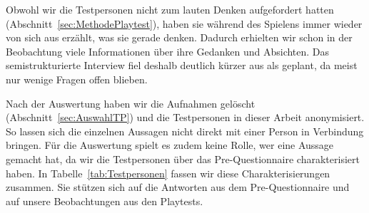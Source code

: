 \documentclass[../Main.tex]{subfiles}
\begin{document}
Obwohl wir die Testpersonen nicht zum lauten Denken aufgefordert hatten (Abschnitt~\ref{sec:MethodePlaytest}), haben sie während des Spielens immer wieder von sich aus erzählt, was sie gerade denken. Dadurch erhielten wir schon in der Beobachtung viele Informationen über ihre Gedanken und Absichten. Das semistrukturierte Interview fiel deshalb deutlich kürzer aus als geplant, da meist nur wenige Fragen offen blieben.

Nach der Auswertung haben wir die Aufnahmen gelöscht (Abschnitt~\ref{sec:AuswahlTP}) und die Testpersonen in dieser Arbeit anonymisiert. So lassen sich die einzelnen Aussagen nicht direkt mit einer Person in Verbindung bringen. Für die Auswertung spielt es zudem keine Rolle, wer eine Aussage gemacht hat, da wir die Testpersonen über das Pre-Questionnaire charakterisiert haben. In Tabelle~\ref{tab:Testpersonen} fassen wir diese Charakterisierungen zusammen. Sie stützen sich auf die Antworten aus dem Pre-Questionnaire und auf unsere Beobachtungen aus den Playtests.
\end{document}
